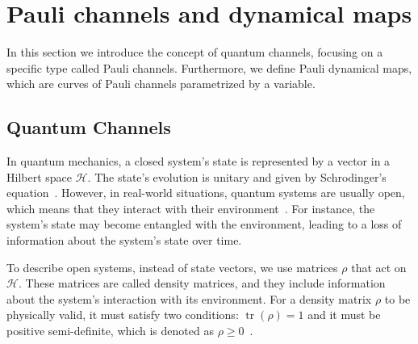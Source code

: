 \documentclass[10pt,letterpaper]{article} %
\DeclareMathOperator{\tr}{tr}
\begin{document}
\section{Pauli channels and dynamical maps}  \label{sec: Pauli Channels} %


In this section  we introduce the concept of quantum channels, focusing on a
specific type called Pauli channels.  Furthermore, we define Pauli dynamical
maps, which are curves of Pauli channels parametrized by a variable.
\subsection{Quantum Channels} \label{subsec: Quantum Channels} %


In quantum mechanics, a closed system's state is represented by a vector in a
Hilbert space $\mathcal{H}$.  The state's evolution is unitary and given by
Schrodinger's equation~\cite{Rieffel}.  However, in real-world situations,
quantum systems are usually open, which means that they interact with their
environment~\cite{Breuer}.  For instance, the system's state may become
entangled with the environment, leading to a loss of information about the
system's state over time.

To describe open systems, instead of state vectors, we use matrices $\rho$ that
act on $\mathcal{H}$.  These matrices are called density matrices, and they
include information about the system's interaction with its environment.  For a
density matrix $\rho$ to be physically valid, it must satisfy two conditions:
$\tr(\rho) = 1$ and it must be positive semi-definite, which is denoted as
$\rho \geq 0$~\cite{chuangbook}.
\end{document}

